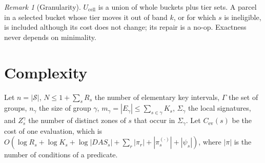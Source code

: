 \documentclass[11pt]{article}
\theoremstyle{definition}
\theoremstyle{remark}
\newtheorem{remark}[theorem]{Remark}
\newcommand{\SC}{\mathcal S}
\begin{document}
\begin{remark}[Granularity]
$U_{\mathrm{cell}}$ is a union of whole buckets plus tier sets. A parcel in a selected bucket whose tier moves it out of band $k$, or for which $s$ is
ineligible, is included although its cost does not change; its repair is a no-op.
Exactness never depends on minimality.
\end{remark}

\section{Complexity}\label{sec:complexity}

Let $n=|\SC|$, $N\le 1+\sum_sR_s$ the number of elementary key intervals, $\Gamma$ the set of
groups, $n_\gamma$ the size of group $\gamma$, $m_\gamma=|E_\gamma|\le\sum_{s\in\gamma}K_s$,
$\Sigma_\gamma$ the local signatures, and $Z^\gamma_s$ the number of distinct zones of $s$ that
occur in $\Sigma_\gamma$. Let $C_{\mathrm{ev}}(s)$ be the cost of one evaluation, which is
$O(\log R_s+\log K_s+\log|\mathit{DAS}_s|+\sum_{r}|\pi_r|+|\pi^{(\cdot)}_s|+|\psi_s|)$, where $|\pi|$
is the number of conditions of a predicate.
\end{document}
